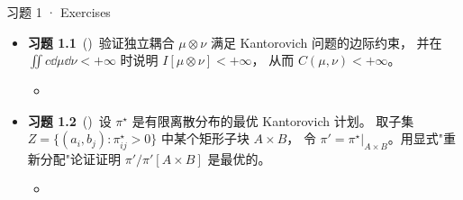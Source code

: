 \begin{frame}{习题 1 · Exercises}
  \begin{itemize}
    \item \textbf{习题 1.1}~(\diffI)\ 验证独立耦合 $\mu\otimes\nu$ 满足 Kantorovich 问题的边际约束，
      并在 $\iint c\dd\mu\dd\nu<+\infty$ 时说明 $I[\mu\otimes\nu]<+\infty$，
      从而 $C(\mu,\nu)<+\infty$。
      \begin{itemize}\footnotesize
        \item {}
      \end{itemize}

    \item \textbf{习题 1.2}~(\diffII)\ 设 $\pi^\star$ 是有限离散分布的最优 Kantorovich 计划。
      取子集 $Z=\{(a_i,b_j):\pi^\star_{ij}>0\}$ 中某个矩形子块 $A\times B$，
      令 $\pi'=\pi^\star|_{A\times B}$。用显式"重新分配"论证证明 $\pi'/\pi'[A\times B]$ 是最优的。
      \begin{itemize}\footnotesize
        \item {}
      \end{itemize}


\end{itemize}
\end{frame}
